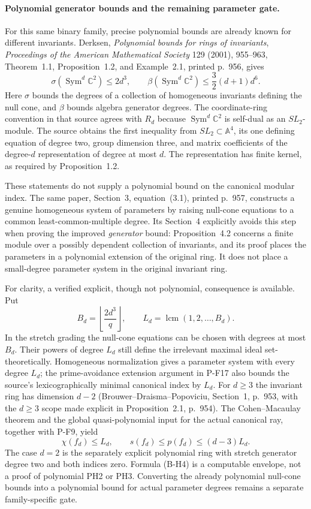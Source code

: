 \documentclass[11pt,a4paper]{article}
\begin{document}
\paragraph{Polynomial generator bounds and the remaining parameter gate.}
For this same binary family, precise polynomial bounds are already
known for different invariants. Derksen,
\emph{Polynomial bounds for rings of invariants},
\emph{Proceedings of the American Mathematical Society} 129 (2001),
955--963, Theorem~1.1, Proposition~1.2, and Example~2.1,
printed p.~956, gives
\[
 \sigma(\operatorname{Sym}^d\mathbb C^2)\le2d^3,
 \qquad
 \beta(\operatorname{Sym}^d\mathbb C^2)
       \le\frac32(d+1)d^6.
 \tag{B-H3}
\]
Here $\sigma$ bounds the degrees of a collection of homogeneous
invariants defining the null cone, and $\beta$ bounds algebra
generator degrees. The coordinate-ring convention in that source
agrees with $R_d$ because $\operatorname{Sym}^d\mathbb C^2$ is
self-dual as an $SL_2$-module. The source obtains the first inequality from
$SL_2\subset\mathbb A^4$, its one defining equation of degree two,
group dimension three, and matrix coefficients of the degree-$d$
representation of degree at most $d$. The representation has
finite kernel, as required by Proposition~1.2.

These statements do not supply a polynomial bound on the canonical
modular index. The same paper, Section~3, equation~(3.1), printed
p.~957, constructs a genuine homogeneous system of parameters by
raising null-cone equations to a common least-common-multiple
degree. Its Section~4 explicitly avoids this step when proving
the improved \emph{generator} bound: Proposition~4.2 concerns a
finite module over a possibly dependent collection of invariants,
and its proof places the parameters in a polynomial extension of
the original ring. It does not place a small-degree parameter
system in the original invariant ring.

For clarity, a verified explicit, though not polynomial, consequence
is available. Put
\[
 B_d=\left\lfloor\frac{2d^3}{q}\right\rfloor,
 \qquad L_d=\operatorname{lcm}(1,2,\ldots,B_d).
\]
In the stretch grading the null-cone equations can be chosen with
degrees at most $B_d$. Their powers of degree $L_d$ still define
the irrelevant maximal ideal set-theoretically. Homogeneous
normalization gives a parameter system with every degree $L_d$;
the prime-avoidance extension argument in P-F17 also bounds the
source's lexicographically minimal canonical index by $L_d$.
For $d\ge3$ the invariant ring has dimension $d-2$
(Brouwer--Draisma--Popoviciu, Section~1, p.~953, with the
$d\ge3$ scope made explicit in Proposition~2.1, p.~954).
The Cohen--Macaulay theorem and the global quasi-polynomial
input for the actual canonical ray, together with P-F9, yield
\[
 \chi(f_d)\le L_d,\qquad
 s(f_d)\le p(f_d)\le(d-3)L_d.
 \tag{B-H4}
\]
The case $d=2$ is the separately explicit polynomial ring with
stretch generator degree two and both indices zero. Formula
(B-H4) is a computable envelope, not a proof of polynomial PH2 or
PH3. Converting the already polynomial null-cone bounds into a
polynomial bound for actual parameter degrees remains a separate
family-specific gate.
\end{document}
